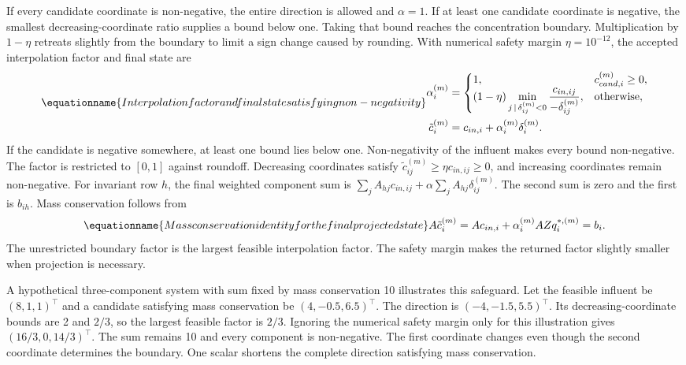 If every candidate coordinate is non-negative, the entire direction is allowed and $\alpha=1$. If at least one candidate coordinate is negative, the smallest decreasing-coordinate ratio supplies a bound below one. Taking that bound reaches the concentration boundary. Multiplication by $1-\eta$ retreats slightly from the boundary to limit a sign change caused by rounding. With numerical safety margin $\eta=10^{-12}$, the accepted interpolation factor and final state are
\begin{equation}
\equationname{Interpolation factor and final state satisfying non-negativity}
\begin{split}
\alpha_i^{(m)}&=
\begin{cases}
1, & c_{cand,i}^{(m)}\geq0,\\
(1-\eta)\displaystyle\min_{j\,\mid\,\delta_{ij}^{(m)}<0}
\frac{c_{in,ij}}{-\delta_{ij}^{(m)}}, & \text{otherwise},
\end{cases}\\
\tilde c_i^{(m)}&=c_{in,i}+\alpha_i^{(m)}\delta_i^{(m)}.
\end{split}
\label{eq:projection_positivity_backtracking}
\end{equation}
If the candidate is negative somewhere, at least one bound lies below one. Non-negativity of the influent makes every bound non-negative. The factor is restricted to $[0,1]$ against roundoff. Decreasing coordinates satisfy $\tilde c_{ij}^{(m)}\geq\eta c_{in,ij}\geq0$, and increasing coordinates remain non-negative. For invariant row $h$, the final weighted component sum is $\sum_jA_{hj}c_{in,ij}+\alpha\sum_jA_{hj}\delta_{ij}^{(m)}$. The second sum is zero and the first is $b_{ih}$. Mass conservation follows from
\begin{equation}
\equationname{Mass conservation identity for the final projected state}
A\tilde c_i^{(m)}=Ac_{in,i}+\alpha_i^{(m)}AZq_i^{*,(m)}=b_i.
\label{eq:projection_final_conservation}
\end{equation}
The unrestricted boundary factor is the largest feasible interpolation factor. The safety margin makes the returned factor slightly smaller when projection is necessary.

A hypothetical three-component system with sum fixed by mass conservation 10 illustrates this safeguard. Let the feasible influent be $(8,1,1)^\top$ and a candidate satisfying mass conservation be $(4,-0.5,6.5)^\top$. The direction is $(-4,-1.5,5.5)^\top$. Its decreasing-coordinate bounds are 2 and $2/3$, so the largest feasible factor is $2/3$. Ignoring the numerical safety margin only for this illustration gives $(16/3,0,14/3)^\top$. The sum remains 10 and every component is non-negative. The first coordinate changes even though the second coordinate determines the boundary. One scalar shortens the complete direction satisfying mass conservation.

